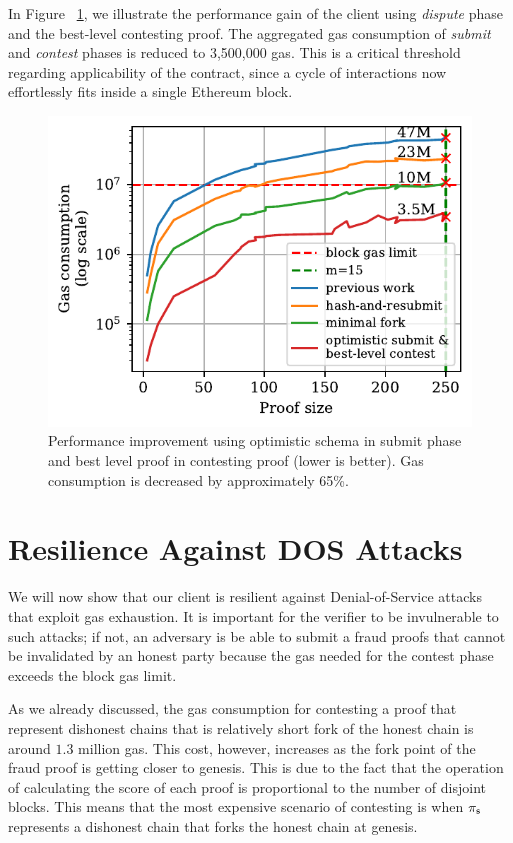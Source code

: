 In Figure ~\ref{fig:dispute-best-level}, we illustrate the performance gain of
the client using \emph{dispute} phase and the best-level contesting proof. The
aggregated gas consumption of \emph{submit} and \emph{contest} phases is
reduced to 3,500,000 gas. This is a critical threshold regarding applicability of
the contract, since a cycle of interactions now effortlessly fits inside a
single Ethereum block.



\begin{figure}[!h]
    \begin{center}
        \includegraphics[width=0.6\columnwidth]{figures/dispute-best-level.pdf}
    \end{center}
    \caption{Performance improvement using optimistic schema in submit phase
        and best level proof in contesting proof (lower is better). Gas
        consumption is decreased by approximately 65\%.}
    \label{fig:dispute-best-level}
\end{figure}
\newpage

\section{Resilience Against DOS Attacks}

We will now show that our client is resilient against Denial-of-Service attacks
that exploit gas exhaustion. It is important for the verifier to be
invulnerable to such attacks; if not, an adversary is be able to submit a fraud
proofs that cannot be invalidated by an honest party because the gas needed for
the contest phase exceeds the block gas limit.

As we already discussed, the gas consumption for contesting a proof that
represent dishonest chains that is relatively short fork of the honest chain
is around $1.3$ million gas. This cost, however, increases as the fork point of
the fraud proof is getting closer to genesis. This is due to the fact that
the operation of calculating the score of each proof is proportional to the
number of disjoint blocks. This means that the most expensive scenario of
contesting is when $\mathsf{\pi_{s}}$ represents a dishonest chain that forks the honest
chain at genesis.

